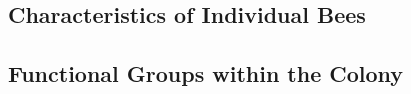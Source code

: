 \subsection{Characteristics of Individual Bees}

\clearpage


\subsection{Functional Groups within the Colony}

\clearpage
